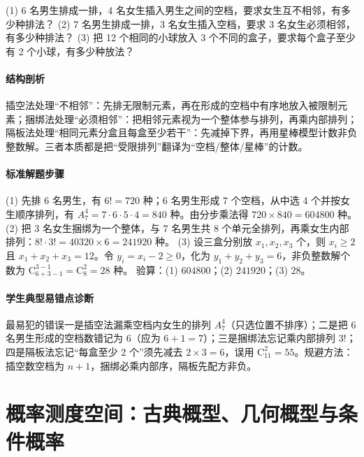 \begin{problem}
(1) 6 名男生排成一排，4 名女生插入男生之间的空档，要求女生互不相邻，有多少种排法？
(2) 7 名男生排成一排，3 名女生插入空档，要求 3 名女生必须相邻，有多少种排法？
(3) 把 12 个相同的小球放入 3 个不同的盒子，要求每个盒子至少有 2 个小球，有多少种放法？
\end{problem}
\begin{solution}
\paragraph{结构剖析}
插空法处理“不相邻”：先排无限制元素，再在形成的空档中有序地放入被限制元素；捆绑法处理“必须相邻”：把相邻元素视为一个整体参与排列，再乘内部排列；隔板法处理“相同元素分盒且每盒至少若干”：先减掉下界，再用星棒模型计数非负整数解。三者本质都是把“受限排列”翻译为“空档/整体/星棒”的计数。
\paragraph{标准解题步骤}
(1) 先排 6 名男生，有 $6!=720$ 种；6 名男生形成 $7$ 个空档，从中选 4 个并按女生顺序排列，有 $A_7^4=7\cdot6\cdot5\cdot4=840$ 种。由分步乘法得 $720\times840=604800$ 种。
(2) 把 3 名女生捆绑为一个整体，与 7 名男生共 $8$ 个单元全排列，再乘女生内部排列：$8!\cdot3!=40320\times6=241920$ 种。
(3) 设三盒分别放 $x_1,x_2,x_3$ 个，则 $x_i\ge2$ 且 $x_1+x_2+x_3=12$。令 $y_i=x_i-2\ge0$，化为 $y_1+y_2+y_3=6$，非负整数解个数为 $\mathrm{C}_{6+3-1}^{3-1}=\mathrm{C}_8^2=28$ 种。
验算：(1) $604800$；(2) $241920$；(3) $28$。
\paragraph{学生典型易错点诊断}
最易犯的错误一是插空法漏乘空档内女生的排列 $A_7^4$（只选位置不排序）；二是把 6 名男生形成的空档数错记为 6（应为 $6+1=7$）；三是捆绑法忘记乘内部排列 $3!$；四是隔板法忘记“每盒至少 2 个”须先减去 $2\times3=6$，误用 $\mathrm{C}_{11}^2=55$。规避方法：插空数空档为 $n+1$，捆绑必乘内部序，隔板先配方非负。
\end{solution}

\section{概率测度空间：古典概型、几何概型与条件概率}

